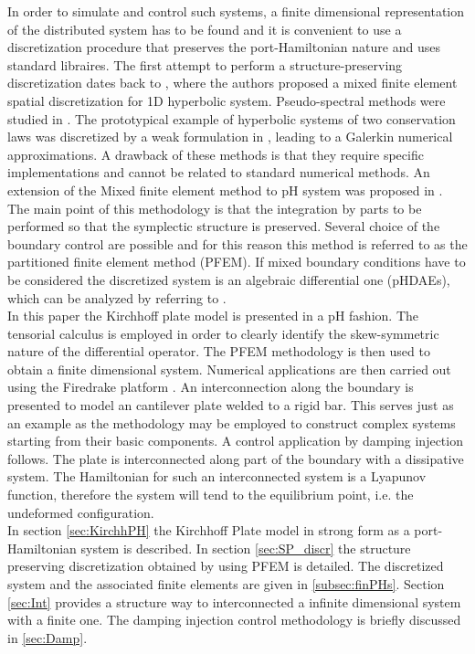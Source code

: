 \documentclass[letterpaper, 10 pt, conference]{ieeeconf}
\begin{document}
In order to simulate and control such systems, a finite dimensional representation of the distributed system has to be found and it is convenient to use a discretization procedure that preserves the port-Hamiltonian nature and uses standard libraires. The first attempt to perform a structure-preserving discretization dates back to \cite{Golo}, where the authors proposed a mixed finite element spatial discretization for 1D hyperbolic system. Pseudo-spectral methods were studied in \cite{moulla:hal-01625008}. The prototypical example of hyperbolic systems of two conservation laws was discretized by a weak formulation in \cite{WeakForm_Kot}, leading to a Galerkin numerical approximations. A drawback of these methods is that they require specific implementations and cannot be related to standard numerical methods. An extension of the Mixed finite element method to pH system was proposed in \cite{CardosoRibeiro2018}. The main point of this methodology is that the integration by parts to be performed so that the symplectic structure is preserved. Several choice of the boundary control are possible and for this reason this method is referred to as the partitioned finite element method (PFEM). If mixed boundary conditions have to be considered the discretized system is an algebraic differential one (pHDAEs), which can be analyzed by referring to \cite{beattie2018linear,vanderSchaft2013}. \\

In this paper the Kirchhoff plate model is presented in a pH fashion. The tensorial calculus is employed in order to clearly identify the skew-symmetric nature of the differential operator. The PFEM methodology is then used to obtain a finite dimensional system. Numerical applications are then carried out using the Firedrake platform \cite{firedrake}. An interconnection along the boundary is presented to model an cantilever plate welded to a rigid bar. This serves just as an example as the methodology may be employed to construct complex systems starting from their basic components. A control application by damping injection follows. The plate is interconnected along part of the boundary with a dissipative system. The Hamiltonian for such an interconnected system is a Lyapunov function, therefore the system will tend to the equilibrium point, i.e. the undeformed configuration. \\

In section \ref{sec:KirchhPH} the Kirchhoff Plate model in strong form as a port-Hamiltonian system is described. In section \ref{sec:SP_discr} the structure preserving discretization obtained by using PFEM  is detailed. The discretized system and the associated finite elements are given in \ref{subsec:finPHs}. Section \ref{sec:Int} provides a structure way to interconnected a infinite dimensional system with a finite one. The damping injection control methodology is briefly discussed in \ref{sec:Damp}. 
\end{document}
